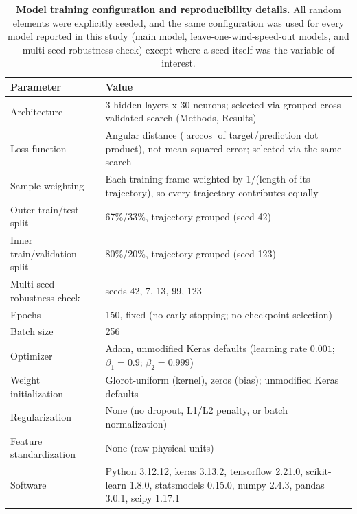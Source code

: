 \documentclass[11pt]{article}
\begin{document}
\begin{table}[h!]
    \centering
    \caption{\textbf{Model training configuration and reproducibility details.} All random elements were explicitly seeded, and the same configuration was used for every model reported in this study (main model, leave-one-wind-speed-out models, and multi-seed robustness check) except where a seed itself was the variable of interest.}
    \begin{tabular}{@{}p{4.7cm}p{9cm}@{}}
        \toprule
        Parameter & Value \\
        \midrule
        Architecture & 3 hidden layers x 30 neurons; selected via grouped cross-validated search (Methods, Results) \\
        Loss function & Angular distance ($\arccos$ of target/prediction dot product), not mean-squared error; selected via the same search \\
        Sample weighting & Each training frame weighted by 1/(length of its trajectory), so every trajectory contributes equally \\
        Outer train/test split & 67\%/33\%, trajectory-grouped (seed 42) \\
        Inner train/validation split & 80\%/20\%, trajectory-grouped (seed 123) \\
        Multi-seed robustness check & seeds 42, 7, 13, 99, 123 \\
        Epochs & 150, fixed (no early stopping; no checkpoint selection) \\
        Batch size & 256 \\
        Optimizer & Adam, unmodified Keras defaults (learning rate $0.001$; $\beta_1=0.9$; $\beta_2=0.999$) \\
        Weight initialization & Glorot-uniform (kernel), zeros (bias); unmodified Keras defaults \\
        Regularization & None (no dropout, L1/L2 penalty, or batch normalization) \\
        Feature standardization & None (raw physical units) \\
        Software & Python 3.12.12, keras 3.13.2, tensorflow 2.21.0, scikit-learn 1.8.0, statsmodels 0.15.0, numpy 2.4.3, pandas 3.0.1, scipy 1.17.1 \\
        \bottomrule
    \end{tabular}
    \label{tab:repro}
\end{table}
\end{document}
